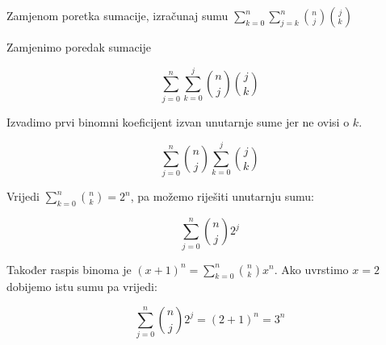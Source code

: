 \documentclass[exam.tex]{subfiles}
\begin{document}
	\begin{task}
		Zamjenom poretka sumacije, izračunaj sumu \( \displaystyle \sum\limits^n_{k=0} \sum\limits^n_{j=k} \binom{n}{j} \binom{j}{k} \) \\[1em]
	\end{task}
	
	Zamjenimo poredak sumacije
	
	\[ \sum\limits^n_{j=0} \sum\limits^j_{k=0} \binom{n}{j} \binom{j}{k} \]
	
	Izvadimo prvi binomni koeficijent izvan unutarnje sume jer ne ovisi o \( k \).
	
	\[ \sum\limits^n_{j=0} \binom{n}{j} \sum\limits^j_{k=0} \binom{j}{k} \]
	
	Vrijedi \( \displaystyle \sum\limits^n_{k=0} \binom{n}{k} = 2^n \), pa možemo riješiti unutarnju sumu:
	
	\[ \sum\limits^n_{j=0} \binom{n}{j} 2^j \]
	
	Također raspis binoma je \( \displaystyle (x + 1)^n = \sum\limits^n_{k=0} \binom{n}{k} x^n \). Ako uvrstimo \( x = 2 \) dobijemo istu sumu pa vrijedi:
	
	\[ \sum\limits^n_{j=0} \binom{n}{j} 2^j = (2 + 1)^n = 3^n \]
\end{document}
